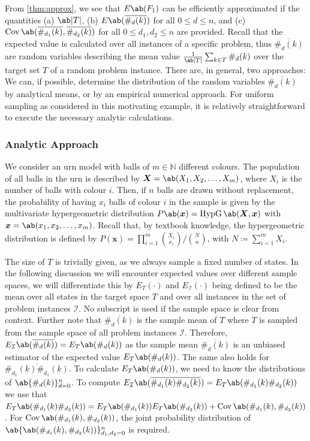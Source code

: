From \cref{thm:approx}, we see that $E\ab(F_1)$ can be efficiently approximated if the quantities (a) $\ab|T|$, (b) $E\ab(\overline{\#_d (k)})$ for all $0 \leq d \leq n$, and (c) $\Cov \ab(\overline{\#_{d_1} (k)}, \overline{\#_{d_2} (k)})$ for all $0 \leq d_1, d_2 \leq n$ are provided. Recall that the expected value is calculated over all instances of a specific problem, thus $\overline{\#_d (k)}$ are random variables describing the mean value $\frac{1}{\ab|T|} \sum_{k \in T} \#_d(k)$ over the target set $T$ of a random problem instance. There are, in general, two approaches: 
We can, if possible, determine the distribution of the random variables $\overline{\#_d (k)}$
by analytical means, or by an empirical
numerical approach. For uniform sampling as considered in this
motivating example, it is relatively straightforward to execute
the necessary analytic calculations. 

\subsubsection{Analytic Approach}
\begin{definition}
    We consider an urn model with balls of $m \in \mathds{N}$ different colours. The population of all balls in the urn is described by $\bm{X} = \ab(X_1, X_2, \dots, X_m)$, where $X_i$ is the number of balls with colour $i$. Then, if $n$ balls are drawn without replacement, the probability of having $x_i$ balls of colour $i$ in the sample is given by the 
    multivariate hypergeometric distribution
%
    \(P\ab(\bm{x}) = \hypgeom \ab(\bm{X}, \bm{x})\)
    with $\bm{x} = \ab(x_1, x_2, \dots, x_m)$. Recall that, by textbook knowledge, the hypergeometric distribution is defined by 
    \(P(\bm{x}) = \prod_{i=1}^m \binom{X_i}{x_i}/\binom{N}{n}\),
         with \(N \coloneqq \sum_{i=1}^m X_i\).
\end{definition}


    The size of $T$ is trivially given, as we always sample a fixed number of states. In the following discussion we will encounter expected values over different sample spaces, we will differentiate this by $E_T(\cdot)$ and $E_{\mathcal{I}}(\cdot)$ being defined to be the mean over all states in the target space $T$ and over all instances in the set of problem instances $\mathcal{I}$. No subscript is used if the sample space is clear from context. Further note that $\overline{\#_d(k)}$ is the sample mean of $T$ where $T$ is sampled from the sample space of all problem instances $\mathcal{I}$. Therefore, $E_{\mathcal{I}}\ab(\overline{\#_d (k)}) = E_T \ab(\#_d (k))$ as the sample mean $\overline{\#_d(k)}$ is an unbiased estimator of the expected value $E_T \ab(\#_d (k))$. The same also holds for $\overline{\#_{d_1}(k) \#_{d_1}(k)}$. To calculate $E_T\ab(\#_d (k))$, we need to know the distributions of $\ab\{\#_d (k)\}_{d=0}^n$. To compute $E_{\mathcal{I}}\ab(\overline{\#_{d_1} (k) \#_{d_2} (k)}) = E_T \ab(\#_{d_1} (k) \#_{d_2} (k))$ we use that $E_T \ab(\#_{d_1}(k) \#_{d_2} (k)) = E_T \ab(\#_{d_1}(k)) E_T \ab(\#_{d_2}(k)) + \Cov\ab(\#_{d_1} (k), \#_{d_2} (k))$. For $\Cov \ab(\#_{d_1} (k), \#_{d_2} (k))$, the joint probability distribution of $\ab\{\ab(\#_{d_1} (k), \#_{d_2} (k))\}_{d_1, d_2 = 0}^n$ is required.

